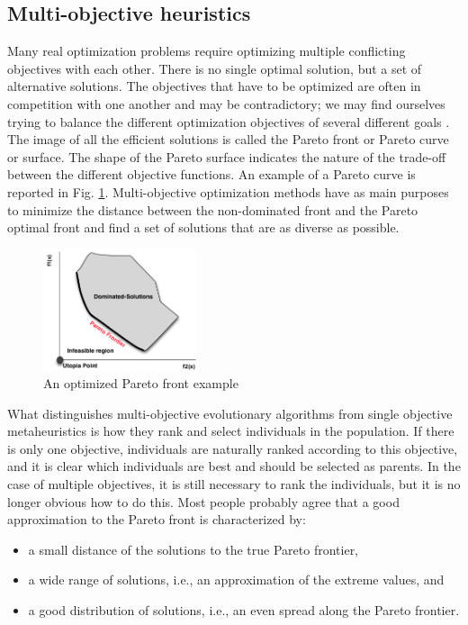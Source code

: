 \documentclass{report}
\begin{document}
\subsection{Multi-objective heuristics}

Many real optimization problems require optimizing multiple conflicting objectives with each other. There is no single optimal solution, but a set of alternative solutions. The objectives that have to be optimized are often in competition with one another and may be contradictory; we may find ourselves trying to balance the different optimization objectives of several different goals \cite{Harman2010} \cite{el2014local}. The image of all the efficient solutions is called the Pareto front or Pareto curve or surface. The shape of the Pareto surface indicates the nature of the trade-off between the different objective functions. An example of a Pareto curve is reported in Fig. \ref{fig:pareto1}. Multi-objective optimization methods have as main purposes to minimize the distance between the non-dominated front and the Pareto optimal front and find a set of solutions that are as diverse as possible.

\begin{figure}[h]
\centering
\includegraphics[width=0.4\textwidth]{./images/paretofront.png}
\caption{An optimized Pareto front example}
\label{fig:pareto1}
\end{figure}

What distinguishes multi-objective evolutionary algorithms from single objective metaheuristics is how they rank and select individuals in the population. If there is only one objective, individuals are naturally ranked according to this objective, and it is clear which individuals are best and should be selected as
parents. In the case of multiple objectives, it is still necessary to rank the individuals, but it is no longer obvious how to do this. Most people probably agree that a good approximation to the Pareto front is characterized by:

\begin{itemize}
\item  a small distance of the solutions to the true Pareto frontier,
\item  a wide range of solutions, i.e., an approximation
of the extreme values, and
\item a good distribution of solutions, i.e., an even
spread along the Pareto frontier.
\end{itemize}
\end{document}
